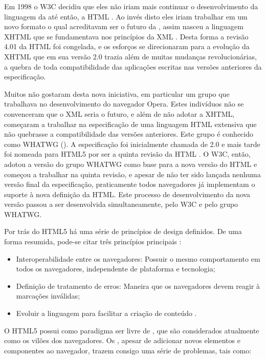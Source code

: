 \documentclass[espaco=simples,appendix=Name]{abnt}
\begin{document}
Em 1998 o W3C decidiu que eles não iriam mais continuar o desenvolvimento da linguagem da  até então, a HTML . Ao invés disto eles iriam trabalhar em um novo formato o qual acreditavam ser o futuro da , assim nasceu a linguagem XHTML  que se fundamentava nos princípios da XML . Desta forma a revisão 4.01 da HTML foi congelada, e os esforços se direcionaram para a evolução da XHTML que em sua versão 2.0 trazia além de muitas mudanças revolucionárias, a quebra de toda compatibilidade das aplicações escritas nas versões anteriores da especificação.

Muitos não gostaram desta nova iniciativa, em particular um grupo que trabalhava no desenvolvimento do navegador Opera. Estes indivíduos não se convenceram que o XML seria o futuro, e além de não adotar a XHTML, começaram a trabalhar na especificação de uma linguagem HTML extensiva que não quebrasse a compatibilidade das versões anteriores. Este grupo é conhecido como WHATWG (). A especificação foi inicialmente chamada de  2.0 e mais tarde foi nomeada para HTML5 por ser a quinta revisão da HTML \cite{HTML5Intro}. O W3C, então, adotou a versão do grupo WHATWG como base para a nova versão do HTML e começou a trabalhar na quinta revisão, e apesar de não ter sido lançada nenhuma versão final da especificação, praticamente todos navegadores já implementam o suporte à nova definição da HTML. Este processo de desenvolvimento da nova versão passou a ser desenvolvida simultaneamente, pelo W3C e pelo grupo WHATWG.

Por trás do HTML5 há uma série de princípios de design definidos. De uma forma resumida, pode-se citar três princípios principais \cite{HTML5Intro}:
\begin{itemize}
		\item Interoperabilidade entre os navegadores: Possuir o mesmo comportamento em todos os navegadores, independente de plataforma e tecnologia;
		\item Definição de tratamento de erros: Maneira que os navegadores devem reagir à marcações inválidas;
		\item Evoluir a linguagem para facilitar a criação de conteúdo .
\end{itemize}

O HTML5 possui como paradigma ser livre de , que são considerados atualmente como os vilões dos navegadores. Os , apesar de adicionar novos elementos e componentes ao navegador, trazem consigo uma série de problemas, tais como:
\end{document}

